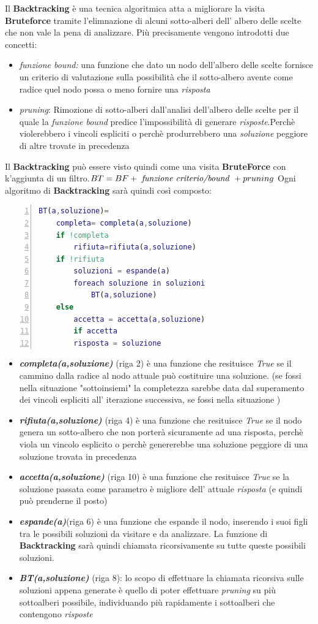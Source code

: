 \documentclass[a4paper]{article}
\newcommand{\imp}[1]{\textbf{\textit{#1}}}
\begin{document}
Il \textbf{Backtracking} è una tecnica algoritmica atta a migliorare la visita \textbf{Bruteforce} tramite l'elimnazione di alcuni sotto-alberi dell' albero delle scelte che non vale la pena di analizzare.
Più precisamente vengono introdotti due concetti:
\begin{itemize}
	\item \textit{funzione bound:} una funzione che dato un nodo dell'albero delle scelte fornisce un criterio di valutazione sulla possibilità che il sotto-albero avente come radice quel nodo possa o meno fornire una \textit{risposta}
	\item \textit{pruning}: Rimozione di sotto-alberi dall'analisi dell'albero delle scelte per il quale la \textit{funzione bound} predice l'impossibilità di generare \textit{risposte}.Perchè violerebbero i vincoli espliciti o perchè produrrebbero una \textit{soluzione} peggiore di altre trovate in precedenza
\end{itemize}
Il \textbf{Backtracking} può essere visto quindi come una visita \textbf{BruteForce} con k'aggiunta di un filtro.$BT = BF + \text{ \textit{funzione criterio/bound} }+ pruning$
Ogni algoritmo di \textbf{Backtracking} sarà quindi così composto:
\begin{lstlisting}[numbers=left,firstnumber=1,stepnumber=1, xleftmargin=15pt, language=Matlab ]
BT(a,soluzione)=
    completa= completa(a,soluzione)
    if !completa
        rifiuta=rifiuta(a,soluzione)
	if !rifiuta
	    soluzioni = espande(a)
	    foreach soluzione in soluzioni
	        BT(a,soluzione)
    else
    	accetta = accetta(a,soluzione)
        if accetta
	    risposta = soluzione
\end{lstlisting}
\begin{itemize}
	\item \imp{completa(a,soluzione)} (riga 2) è una funzione che resituisce \textit{True} se il cammino dalla radice al nodo attuale può costituire una soluzione. (se fossi nella situazione "sottoinsiemi" la completezza sarebbe data dal superamento dei vincoli espliciti all' iterazione successiva, se fossi nella situazione )
	\item \imp{rifiuta(a,soluzione)} (riga 4) è una funzione che resituisce \textit{True} se il nodo genera un sotto-albero che non porterà sicuramente ad una risposta, perchè viola un vincolo esplicito o perchè genererebbe una soluzione peggiore di una soluzione trovata in precedenza
	\item \imp{accetta(a,soluzione)} (riga 10) è una funzione che resituisce \textit{True} se la soluzione passata come parametro è migliore dell' attuale \textit{risposta} (e quindi può prenderne il posto)
	\item \imp{espande(a)}(riga 6) è una funzione che espande il nodo, inserendo i suoi figli tra le possibili soluzioni da visitare e da analizzare. La funzione di \textbf{Backtracking} sarà quindi chiamata ricorsivamente su tutte queste possibili soluzioni.
	\item \imp{BT(a,soluzione)} (riga 8): lo scopo di effettuare la chiamata ricorsiva sulle soluzioni appena generate è quello di poter effettuare \textit{pruning} su più sottoalberi possibile, individuando più rapidamente i sottoalberi che contengono \textit{risposte}
\end{itemize}
\end{document}
